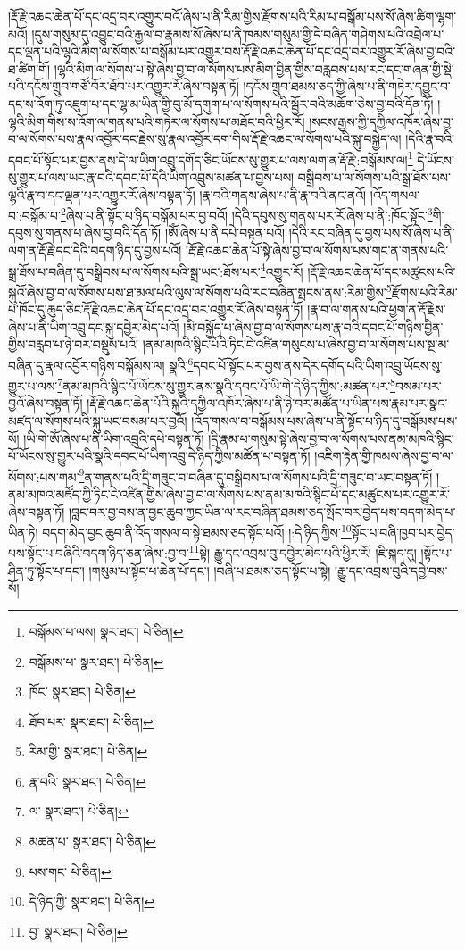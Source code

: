 །རྡོ་རྗེ་འཆང་ཆེན་པོ་དང་འདྲ་བར་འགྱུར་བའོ་ཞེས་པ་ནི་རིམ་གྱིས་རྫོགས་པའི་རིམ་པ་བསྒོམ་པས་སོ་ཞེས་ཚིག་ལྷག་མའོ། །དུས་གསུམ་དུ་འབྱུང་བའི་རྒྱལ་བ་རྣམས་སོ་ཞེས་པ་ནི་ཁམས་གསུམ་གྱི་དེ་བཞིན་གཤེགས་པའི་འབྲེལ་པ་དང་ལྡན་པའི་ལྷའི་མིག་ལ་སོགས་པ་བསྒོམ་པར་འགྱུར་བས་རྡོ་རྗེ་འཆང་ཆེན་པོ་དང་འདྲ་བར་འགྱུར་རོ་ཞེས་བྱ་བའི་ཐ་ཚིག་གོ། །ལྷའི་མིག་ལ་སོགས་པ་སྟེ་ཞེས་བྱ་བ་ལ་སོགས་པས་མིག་བྱིན་གྱིས་བརླབས་པས་རང་དང་གཞན་གྱི་སྡེ་པའི་དངོས་གྲུབ་གཙོ་བོར་ཐོབ་པར་འགྱུར་རོ་ཞེས་བསྟན་ཏོ། །དངོས་གྲུབ་ཐམས་ཅད་ཀྱི་ཞེས་པ་ནི་གཏེར་དབྱུང་བ་དང་ས་འོག་ཏུ་འཇུག་པ་དང་ལྷ་མ་ཡིན་གྱི་བུ་མོ་དགུག་པ་ལ་སོགས་པའི་སྦྱོར་བའི་མཆོག་ཅེས་བྱ་བའི་དོན་ཏོ། །ལྷའི་མིག་གིས་ས་འོག་ལ་གནས་པའི་གཏེར་ལ་སོགས་པ་མཐོང་བའི་ཕྱིར་རོ། །སངས་རྒྱས་ཀྱི་དཀྱིལ་འཁོར་ཞེས་བྱ་བ་ལ་སོགས་པས་རྣལ་འབྱོར་དང་རྗེས་སུ་རྣལ་འབྱོར་དག་གིས་རྡོ་རྗེ་འཆང་ལ་སོགས་པའི་སྐུ་བསྐྱེད་ལ། །དེའི་རྣ་བའི་དབང་པོ་སྟོང་པར་བྱས་ནས་དེ་ལ་ཡིག་འབྲུ་དགོད་ཅིང་ཡོངས་སུ་གྱུར་པ་ལས་ལག་ན་རྡོ་རྗེ་:བསྒོམས་ལ།\footnote{བསྒོམས་པ་ལས།  སྣར་ཐང་།  པེ་ཅིན། } དེ་ཡོངས་སུ་གྱུར་པ་ལས་ཡང་རྣ་བའི་དབང་པོ་དེའི་ཡིག་འབྲུས་མཚན་པ་བྱས་པས། བསྒྲིབས་པ་ལ་སོགས་པའི་སྒྲ་ཐོས་པས་ལྷའི་རྣ་བ་དང་ལྡན་པར་འགྱུར་རོ་ཞེས་བསྟན་ཏོ། །རྣ་བའི་གནས་ཞེས་པ་ནི་རྣ་བའི་ནང་ནའོ། །འོད་གསལ་བ་:བསྒོམ་པ་\footnote{བསྒོམས་པ་  སྣར་ཐང་།  པེ་ཅིན། }ཞེས་པ་ནི་སྟོང་པ་ཉིད་བསྒོམ་པར་བྱ་བའོ། །དེའི་དབུས་སུ་གནས་པར་རོ་ཞེས་པ་ནི་:ཁོང་སྟོང་\footnote{ཁོང་  སྣར་ཐང་།  པེ་ཅིན། }གི་དབུས་སུ་གནས་པ་ཞེས་བྱ་བའི་དོན་ཏོ། །ཨོཾ་ཞེས་པ་ནི་དཔེ་བསྟན་པའོ། །དེའི་རང་བཞིན་དུ་བྱས་པས་སོ་ཞེས་པ་ནི་ལག་ན་རྡོ་རྗེ་དང་དེའི་བདག་ཉིད་དུ་བྱས་པའོ། །རྡོ་རྗེ་འཆང་ཆེན་པོ་སྟེ་ཞེས་བྱ་བ་ལ་སོགས་པས་གང་ན་གནས་པའི་སྒྲ་ཐོས་པ་བཞིན་དུ་བསྒྲིབས་པ་ལ་སོགས་པའི་སྒྲ་ཡང་:ཐོས་པར་\footnote{ཐོབ་པར་  སྣར་ཐང་།  པེ་ཅིན། }འགྱུར་རོ། །རྡོ་རྗེ་འཆང་ཆེན་པོ་དང་མཚུངས་པའི་སྐུའོ་ཞེས་བྱ་བ་ལ་སོགས་པས་ཐ་མལ་པའི་ལུས་ལ་སོགས་པའི་རང་བཞིན་སྤངས་ནས་:རིམ་གྱིས་\footnote{རིམ་གྱི་  སྣར་ཐང་།  པེ་ཅིན། }རྫོགས་པའི་རིམ་པ་ཁོང་དུ་ཆུད་ཅིང་རྡོ་རྗེ་འཆང་ཆེན་པོ་དང་འདྲ་བར་འགྱུར་རོ་ཞེས་བསྟན་ཏོ། །རྣ་བ་ལ་གནས་པའི་ཕྱག་ན་རྡོ་རྗེས་ཞེས་པ་ནི་ཡིག་འབྲུ་དང་སྐུ་དབྱེར་མེད་པའོ། །མི་བསྐྱོད་པ་ཞེས་བྱ་བ་ལ་སོགས་པས་རྣ་བའི་དབང་པོ་གཉིས་བྱིན་གྱིས་བརླབ་པ་ཉེ་བར་བསྡུས་པའོ། །ནམ་མཁའི་སྙིང་པོའི་ཏིང་ངེ་འཛིན་གསུངས་པ་ཞེས་བྱ་བ་ལ་སོགས་པས་སྔ་མ་བཞིན་དུ་རྣལ་འབྱོར་གཉིས་བསྒོམས་ལ། སྣའི་\footnote{རྣ་བའི་  སྣར་ཐང་།  པེ་ཅིན། }དབང་པོ་སྟོང་པར་བྱས་ནས་དེར་དགོད་པའི་ཡིག་འབྲུ་ཡོངས་སུ་གྱུར་པ་ལས་\footnote{ལ་  སྣར་ཐང་།  པེ་ཅིན། }ནམ་མཁའི་སྙིང་པོ་ཡོངས་སུ་གྱུར་ནས་སྣའི་དབང་པོ་ཡི་གེ་དེ་ཉིད་ཀྱིས་:མཚན་པར་\footnote{མཚན་པ་  སྣར་ཐང་།  པེ་ཅིན། }བསམ་པར་བྱའོ་ཞེས་བསྟན་ཏོ། །རྡོ་རྗེ་འཆང་ཆེན་པོའི་སྐུའི་དཀྱིལ་འཁོར་ཞེས་པ་ནི་ཉེ་བར་མཚོན་པ་ཡིན་པས་རྣམ་པར་སྣང་མཛད་ལ་སོགས་པའི་སྐུ་ཡང་བསམ་པར་བྱའོ། །འོད་གསལ་བ་བསྒོམས་པས་ཞེས་པ་ནི་སྟོང་པ་ཉིད་དུ་བསྒོམས་པས་སོ། །ཡི་གེ་ཨོཾ་ཞེས་པ་ནི་ཡིག་འབྲུའི་དཔེ་བསྟན་ཏོ། །དྲི་རྣམ་པ་གསུམ་སྟེ་ཞེས་བྱ་བ་ལ་སོགས་པས་ནམ་མཁའི་སྙིང་པོ་ཡོངས་སུ་གྱུར་པའི་སྣའི་དབང་པོ་ཡིག་འབྲུ་དེ་ཉིད་ཀྱིས་མཚོན་པ་བསྟན་ཏོ། །འཇིག་རྟེན་གྱི་ཁམས་ཞེས་བྱ་བ་ལ་སོགས་:པས་གམ་\footnote{པས་གང་  པེ་ཅིན། }ན་གནས་པའི་དྲི་གཟུང་བ་བཞིན་དུ་བསྒྲིབས་པ་ལ་སོགས་པའི་དྲི་གཟུང་བ་ཡང་བསྟན་ཏོ། །ནམ་མཁའ་མཛོད་ཀྱི་ཏིང་ངེ་འཛིན་གྱིས་ཞེས་བྱ་བ་ལ་སོགས་པས་ནམ་མཁའི་སྙིང་པོ་དང་མཚུངས་པར་འགྱུར་རོ་ཞེས་བསྟན་ཏོ། །བླང་བར་བྱ་བས་ན་བྱང་ཆུབ་ཀྱང་ཡིན་ལ་རང་བཞིན་ཐམས་ཅད་སྤོང་བར་བྱེད་པས་བདག་མེད་པ་ཡིན་ཏེ། བདག་མེད་བྱང་ཆུབ་ནི་འོད་གསལ་བ་སྟེ་ཐམས་ཅད་སྟོང་པའོ། །:དེ་ཉིད་ཀྱིས་\footnote{དེ་ཉིད་ཀྱི་  སྣར་ཐང་།  པེ་ཅིན། }སྟོང་པ་བཞི་ཁྱབ་པར་བྱེད་པས་སྟོང་པ་བཞིའི་བདག་ཉིད་ཅན་ཞེས་:བྱ་བ་\footnote{བྱ་  སྣར་ཐང་།  པེ་ཅིན། }སྟེ། རྒྱུ་དང་འབྲས་བུ་དབྱེར་མེད་པའི་ཕྱིར་རོ། །ཇི་སྐད་དུ། །སྟོང་པ་ཤིན་ཏུ་སྟོང་པ་དང་། །གསུམ་པ་སྟོང་པ་ཆེན་པོ་དང་། །བཞི་པ་ཐམས་ཅད་སྟོང་པ་སྟེ། །རྒྱུ་དང་འབྲས་བུའི་དབྱེ་བས་སོ། 